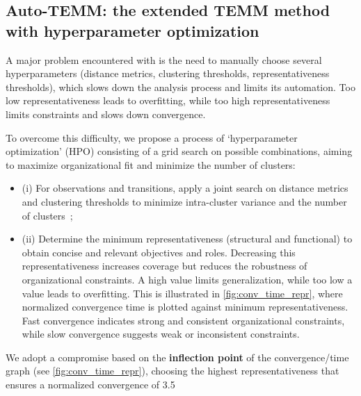 \begin{itemize}
        \subsection{Auto-TEMM: the extended TEMM method with hyperparameter optimization}

        A major problem encountered with  is the need to manually choose several hyperparameters (distance metrics, clustering thresholds, representativeness thresholds), which slows down the analysis process and limits its automation. Too low representativeness leads to overfitting, while too high representativeness limits constraints and slows down convergence.


        To overcome this difficulty, we propose a process of ‘hyperparameter optimization’ (HPO) consisting of a grid search on possible combinations, aiming to maximize organizational fit and minimize the number of clusters:

        \begin {itemize}
  \item (i) For observations and transitions, apply a joint search on distance metrics and clustering thresholds to minimize intra-cluster variance and the number of clusters~;
  \item (ii) Determine the minimum representativeness (structural and functional) to obtain concise and relevant objectives and roles. Decreasing this representativeness increases coverage but reduces the robustness of organizational constraints. A high value limits generalization, while too low a value leads to overfitting. This is illustrated in \autoref{fig:conv_time_repr}, where normalized convergence time is plotted against minimum representativeness. Fast convergence indicates strong and consistent organizational constraints, while slow convergence suggests weak or inconsistent constraints.
\end{itemize}

We adopt a compromise based on the \textbf{inflection point} of the convergence/time graph (see \autoref{fig:conv_time_repr}), choosing the highest representativeness that ensures a normalized convergence of 3.5%


\end{itemize}

